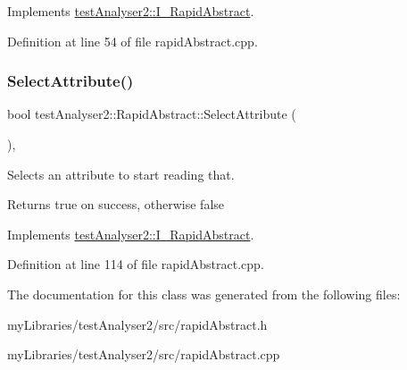 Implements \mbox{\hyperlink{classtestAnalyser2_1_1I__RapidAbstract_a95d6bb9f515adb49e62396e48d23d88f}{test\+Analyser2\+::\+I\+\_\+\+Rapid\+Abstract}}.



Definition at line 54 of file rapid\+Abstract.\+cpp.

\mbox{\label{classtestAnalyser2_1_1RapidAbstract_a5ca627c1c860c9f5ff58cb6bf612fe81}} 
\subsubsection{\texorpdfstring{SelectAttribute()}{SelectAttribute()}}
{\footnotesize\ttfamily bool test\+Analyser2\+::\+Rapid\+Abstract\+::\+Select\+Attribute (\begin{DoxyParamCaption}{ }\end{DoxyParamCaption})\hspace{0.3cm}{\ttfamily [override]}, {\ttfamily [virtual]}}



Selects an attribute to start reading that. 

\begin{DoxyReturn}{Returns}
true on success, otherwise false 
\end{DoxyReturn}


Implements \mbox{\hyperlink{classtestAnalyser2_1_1I__RapidAbstract_a916b023a5b55e1334f6595ed9d4cb7d8}{test\+Analyser2\+::\+I\+\_\+\+Rapid\+Abstract}}.



Definition at line 114 of file rapid\+Abstract.\+cpp.



The documentation for this class was generated from the following files\+:\begin{DoxyCompactItemize}
\item 
my\+Libraries/test\+Analyser2/src/rapid\+Abstract.\+h\item 
my\+Libraries/test\+Analyser2/src/rapid\+Abstract.\+cpp\end{DoxyCompactItemize}
